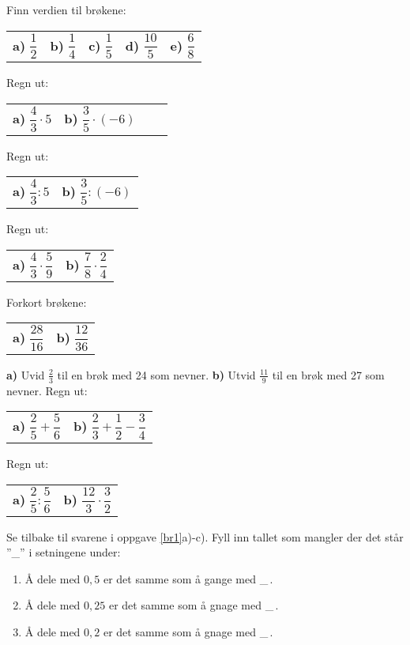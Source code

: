 



\opgt
{}
Finn verdien til brøkene:\os
\begin{tabular}{@{}l l l l l}
	\textbf{a)} $ \dfrac{1}{2} $ & 	
	\textbf{b)} $ \dfrac{1}{4} $ & 	
	\textbf{c)} $ \dfrac{1}{5} $ &
	\textbf{d)} $ \dfrac{10}{5} $  & 
	\textbf{e)} $ \dfrac{6}{8} $
\end{tabular}
\nes

Regn ut:\os
\begin{tabular}{@{}l l l l}
	\textbf{a)} $ \dfrac{4}{3}\cdot5 $ & 	\textbf{b)} $ \dfrac{3}{5}\cdot(-6) $ 
\end{tabular}

\nes
{}
Regn ut:\os
\begin{tabular}{@{}l l}
	\textbf{a)} $ \dfrac{4}{3}:5 $ & 	\textbf{b)} $ \dfrac{3}{5}:(-6) $
\end{tabular}

\nes
{}
Regn ut:\os
\begin{tabular}{@{}l l}
	\textbf{a)} $ \dfrac{4}{3}\cdot\dfrac{5}{9} $ & 	\textbf{b)} $ \dfrac{7}{8}\cdot\dfrac{2}{4} $ 
\end{tabular}

\nes

Forkort brøkene:\os
\begin{tabular}{@{}l l}
	\textbf{a)} $ \dfrac{28}{16} $ & 	\textbf{b)} $ \dfrac{12}{36} $ 
\end{tabular}

\textbf{a)} Uvid $ \frac{2}{3} $ til en brøk med 24 som nevner.\os
\textbf{b)} Utvid $ \frac{11}{9} $ til en brøk med 27 som nevner. 
\newpage
\nes
{}
Regn ut:\os
\begin{tabular}{@{}l l }
	\textbf{a)}	$ \dfrac{2}{5}+\dfrac{5}{6} $&\textbf{b)} $ \dfrac{2}{3}+\dfrac{1}{2}-\dfrac{3}{4} $
\end{tabular}

\nes
{}
Regn ut:\os
\begin{tabular}{@{}l l }
	\textbf{a)}	$ \dfrac{2}{5}:\dfrac{5}{6} $&\textbf{b)} $ \dfrac{12}{3}\cdot\dfrac{3}{2} $
\end{tabular}

Se tilbake til svarene i oppgave \ref{br1}a)-c). Fyll inn tallet som mangler der det står ''\_'' i setningene under:
{\renewcommand{\labelenumi}{(\alph{enumi})}
	\begin{enumerate}
		\item Å dele med $ 0,5 $ er det samme som å gange med \_\,.
		\item Å dele med $ 0,25 $ er det samme som å gnage med \_\,.
		\item Å dele med $ 0,2 $ er det samme som å gnage med \_\,.	
\end{enumerate} }




